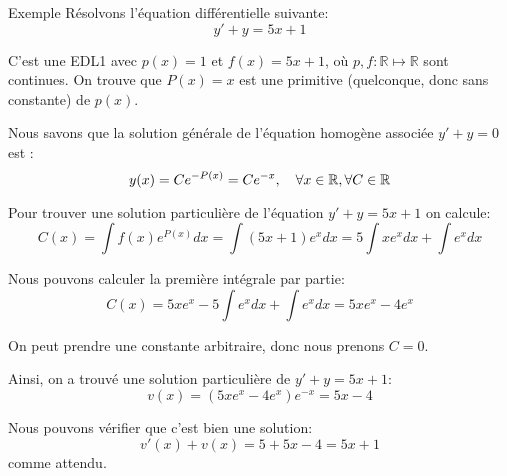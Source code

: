 \documentclass[a4paper]{article}
\begin{document}
\begin{parag}{Exemple}
    Résolvons l'équation différentielle suivante:
    \[y' + y = 5x + 1\]

    C'est une EDL1 avec $p\left(x\right) = 1$ et $f\left(x\right) = 5x + 1$, où $p, f : \mathbb{R} \mapsto \mathbb{R}$ sont continues. On trouve que $P\left(x\right) = x$ est une primitive (quelconque, donc sans constante) de $p\left(x\right)$.

    Nous savons que la solution générale de l'équation homogène associée $y' + y = 0$ est :
    \[y\left(x\right) = Ce^{-P\left(x\right)} = Ce^{-x}, \mathspace \forall x \in \mathbb{R}, \forall C \in \mathbb{R}\]

    Pour trouver une solution particulière de l'équation $y' + y = 5x + 1$ on calcule:
    \[C\left(x\right) = \int f\left(x\right) e^{P\left(x\right)}dx = \int \left(5x + 1\right) e^{x} dx = 5\int xe^{x} dx + \int e^x dx\]

    Nous pouvons calculer la première intégrale par partie:
    \[C\left(x\right) = 5xe^x - 5 \int e^x dx + \int e^x dx = 5xe^x - 4e^x\]

    On peut prendre une constante arbitraire, donc nous prenons $C = 0$.

    Ainsi, on a trouvé une solution particulière de $y' + y = 5x + 1$:
    \[v\left(x\right) = \left(5x e^x - 4e^x\right)e^{-x} = 5x - 4\]

    Nous pouvons vérifier que c'est bien une solution:
    \[v'\left(x\right) + v\left(x\right) = 5 + 5x - 4 = 5x + 1\]
    comme attendu.
\end{parag}
\end{document}
